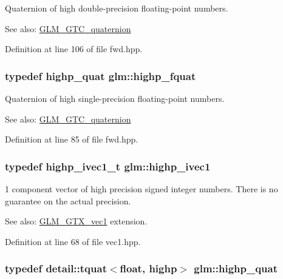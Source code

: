 Quaternion of high double-precision floating-point numbers.

\begin{Desc}
\item[See also:]\hyperlink{group__gtc__quaternion}{GLM\_\-GTC\_\-quaternion} \end{Desc}


Definition at line 106 of file fwd.hpp.\hypertarget{namespaceglm_d1acf6af4ae4af94dfec8814b058d5eb}{
\subsubsection[highp\_\-fquat]{\setlength{\rightskip}{0pt plus 5cm}typedef {\bf highp\_\-quat} {\bf glm::highp\_\-fquat}}}
\label{namespaceglm_d1acf6af4ae4af94dfec8814b058d5eb}


Quaternion of high single-precision floating-point numbers.

\begin{Desc}
\item[See also:]\hyperlink{group__gtc__quaternion}{GLM\_\-GTC\_\-quaternion} \end{Desc}


Definition at line 85 of file fwd.hpp.\hypertarget{namespaceglm_ddb6724b01f125e2730aeaad6130b06f}{
\subsubsection[highp\_\-ivec1]{\setlength{\rightskip}{0pt plus 5cm}typedef highp\_\-ivec1\_\-t {\bf glm::highp\_\-ivec1}}}
\label{namespaceglm_ddb6724b01f125e2730aeaad6130b06f}


1 component vector of high precision signed integer numbers. There is no guarantee on the actual precision. \begin{Desc}
\item[See also:]\hyperlink{group__gtx__vec1}{GLM\_\-GTX\_\-vec1} extension. \end{Desc}


Definition at line 68 of file vec1.hpp.\hypertarget{namespaceglm_8d2836172e6561f6519c39d0b5d025c1}{
\subsubsection[highp\_\-quat]{\setlength{\rightskip}{0pt plus 5cm}typedef detail::tquat$<$float, highp$>$ {\bf glm::highp\_\-quat}}}
\label{namespaceglm_8d2836172e6561f6519c39d0b5d025c1}


